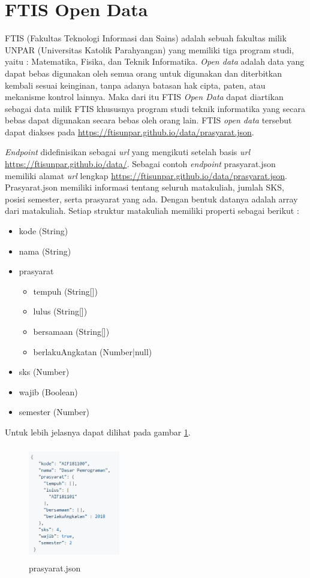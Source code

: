 \section{FTIS Open Data}
FTIS (Fakultas Teknologi Informasi dan Sains) adalah sebuah fakultas milik UNPAR (Universitas Katolik Parahyangan) yang memiliki tiga program studi, yaitu : Matematika, Fisika, dan Teknik Informatika. \textit{Open data} adalah data yang dapat bebas digunakan oleh semua orang untuk digunakan dan diterbitkan kembali sesuai keinginan, tanpa adanya batasan hak cipta, paten, atau mekanisme kontrol lainnya. Maka dari itu FTIS \textit{Open Data} dapat diartikan sebagai data milik FTIS khususnya program studi teknik informatika yang secara bebas dapat digunakan secara bebas oleh orang lain. FTIS \textit{open data} tersebut dapat diakses pada \url{https://ftisunpar.github.io/data/prasyarat.json}.

\textit{Endpoint} didefinisikan sebagai \textit{url} yang mengikuti setelah basis \textit{url} \url{https://ftisunpar.github.io/data/}. Sebagai contoh \textit{endpoint} prasyarat.json memiliki alamat \textit{url} lengkap \url{https://ftisunpar.github.io/data/prasyarat.json}. Prasyarat.json memiliki informasi tentang seluruh matakuliah, jumlah SKS, posisi semester, serta prasyarat yang ada. Dengan bentuk datanya adalah array dari matakuliah. Setiap struktur matakuliah memiliki properti sebagai berikut : 

\begin{itemize}
    \item kode (String)
    \item nama (String)
    \item prasyarat
    \begin{itemize}
        \item tempuh (String[])
        \item lulus (String[])
        \item bersamaan (String[])
        \item berlakuAngkatan (Number|null)
    \end{itemize}
    \item sks (Number)
    \item wajib (Boolean)
    \item semester (Number)
\end{itemize}

Untuk lebih jelasnya dapat dilihat pada gambar \ref{fig:prasyaratJson}.

\begin{figure}[H]
    \centering
    \includegraphics[width=4cm, height=5cm]{Gambar/prasyaratJson.jpg}
    \caption{prasyarat.json}
    \label{fig:prasyaratJson}
\end{figure}

